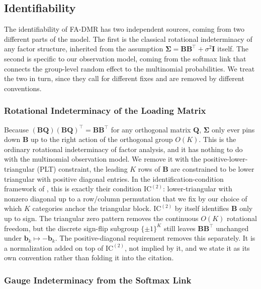 \subsection{Identifiability}
\label{subsec:identifiability}

The identifiability of FA-DMR has two independent sources, coming from two different parts of the model. The first is the classical rotational indeterminacy of any factor structure, inherited from the assumption $\bm{\Sigma}=\mathbf{B}\mathbf{B}^{\top}+\sigma^{2}\mathbf{I}$ itself. The second is specific to our observation model, coming from the softmax link that connects the group-level random effect to the multinomial probabilities. We treat the two in turn, since they call for different fixes and are removed by different conventions.

\subsubsection{Rotational Indeterminacy of the Loading Matrix}
\label{subsubsec:rotational-indeterminacy}

Because $\left(\mathbf{B}\mathbf{Q}\right)\left(\mathbf{B}\mathbf{Q}\right)^{\top}=\mathbf{B}\mathbf{B}^{\top}$ for any orthogonal matrix $\mathbf{Q}$, $\bm{\Sigma}$ only ever pins down $\mathbf{B}$ up to the right action of the orthogonal group $O(K)$. This is the ordinary rotational indeterminacy of factor analysis, and it has nothing to do with the multinomial observation model. We remove it with the positive-lower-triangular (PLT) constraint, the leading $K$ rows of $\mathbf{B}$ are constrained to be lower triangular with positive diagonal entries. In the identification-condition framework of \citet{Cui2026}, this is exactly their condition $\mathrm{IC}^{(2)}$: lower-triangular with nonzero diagonal up to a row/column permutation that we fix by our choice of which $K$ categories anchor the triangular block. $\mathrm{IC}^{(2)}$ by itself identifies $\mathbf{B}$ only up to sign. The triangular zero pattern removes the continuous $O(K)$ rotational freedom, but the discrete sign-flip subgroup $\{\pm1\}^K$ still leaves $\mathbf{B}\mathbf{B}^\top$ unchanged under $\mathbf{b}_k\mapsto-\mathbf{b}_k$. The positive-diagonal requirement removes this separately. It is a normalization added on top of $\mathrm{IC}^{(2)}$, not implied by it, and we state it as its own convention rather than folding it into the citation.

\subsubsection{Gauge Indeterminacy from the Softmax Link}
\label{subsubsec:gauge-indeterminacy}

